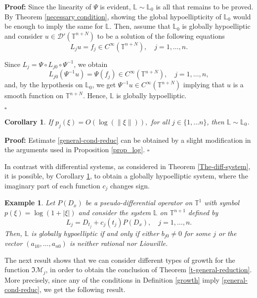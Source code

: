 \documentclass[12pt]{elsarticle}
\newtheorem{example}[theorem]{Example}
\newtheorem{corollary}[theorem]{Corollary}
\numberwithin{equation}{section}
\newenvironment{proof}[1][\noindent \textbf{Proof: }]{#1}{ \hfill $\square$ \vspace{2mm}}
\begin{document}
\begin{proof}
Since the linearity of $\Psi$ is evident, $\mathbb{L}\sim \mathbb{L}_0$
is all that remains to be proved.  By Theorem \ref{necessary condition}, 
showing the global hypoellipticity of $\mathbb{L}_0$  would be enough to imply the same for $\mathbb{L}$.  Then, assume that $\mathbb{L}_0$ is globally hypoelliptic and consider $u \in \mathcal{D}'(\mathbb{T}^{n+N})$ to be a solution of the following  equations 
$$
L_{j} u = f_j \in C^{\infty}(\mathbb{T}^{n+N}), \quad j = 1, \ldots, n.
$$

Since $L_j = \Psi\circ L_{j0}  \circ  \Psi^{-1}$, we obtain
$$
L_{j0} (\Psi^{-1} u) = \Psi (f_j)  \in C^{\infty}(\mathbb{T}^{n+N}), \quad j = 1, \ldots, n,
$$
and, by the hypothesis on  $\mathbb{L}_0$, we get 
$\Psi^{-1} u \in  C^{\infty}(\mathbb{T}^{n+N})$ implying that $u$ is a smooth function on $\mathbb{T}^{n+N}$. Hence, $\mathbb{L}$ is globally hypoelliptic.


\end{proof}





\begin{corollary}\label{reduction-p-log}
	If $p_j(\xi)=O(\log(\|\xi\|)),$ for all $j\in\{1, \ldots n\}$, then $\mathbb{L} \sim \mathbb{L}_0$.  
\end{corollary}



\begin{proof}
	Estimate \eqref{general-cond-reduc} can be obtained by  a slight modification in the arguments used in Proposition \ref{prop_log}.
\end{proof}


In contrast with differential systems, as considered in Theorem \ref{The-diff-system}, it is possible, by Corollary \ref{reduction-p-log}, to obtain a globally hypoelliptic system, where the imaginary part of each function $c_j$ changes sign.

\begin{example}
	Let $P(D_x)$ be a pseudo-differential operator on $\mathbb{T}^1$ with symbol $p(\xi)= \log(1+ |\xi|)$ and consider the system
	$\mathbb{L}$  on $\mathbb{T}^{n+1}$ defined by
	$$
L_j = D_{t_j} + c_j(t_j)P(D_x), \quad j=1,\ldots,n.
	$$ 
	Then, $\mathbb{L}$ is globally hypoelliptic if and only if  either $b_{j0} \neq 0$ for some $j$ or the vector $(a_{10}, \ldots, a_{n0})$ is neither rational nor Liouville.	
\end{example}


The next result shows that we can consider different types of growth for the function $\Im \mathcal{M}_j$, in order to obtain the conclusion of Theorem \ref{t-general-reduction}. More precisely, since any of the conditions in Definition \ref{growth} imply  \eqref{general-cond-reduc}, we  get the following result.
\end{document}
